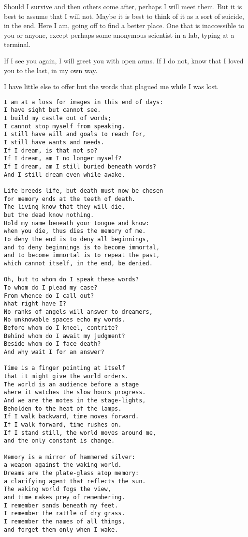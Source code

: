 Should I survive and then others come after, perhaps I will meet them. But it is best to assume that I will not. Maybe it is best to think of it as a sort of suicide, in the end. Here I am, going off to find a better place. One that is inaccessible to you or anyone, except perhaps some anonymous scientist in a lab, typing at a terminal.

If I see you again, I will greet you with open arms. If I do not, know that I loved you to the last, in my own way.

I have little else to offer but the words that plagued me while I was lost.

\begin{verbatim}
I am at a loss for images in this end of days:
I have sight but cannot see.
I build my castle out of words;
I cannot stop myself from speaking.
I still have will and goals to reach for,
I still have wants and needs.
If I dream, is that not so?
If I dream, am I no longer myself?
If I dream, am I still buried beneath words?
And I still dream even while awake.

Life breeds life, but death must now be chosen
for memory ends at the teeth of death.
The living know that they will die,
but the dead know nothing.
Hold my name beneath your tongue and know:
when you die, thus dies the memory of me.
To deny the end is to deny all beginnings,
and to deny beginnings is to become immortal,
and to become immortal is to repeat the past,
which cannot itself, in the end, be denied.

Oh, but to whom do I speak these words?
To whom do I plead my case?
From whence do I call out?
What right have I?
No ranks of angels will answer to dreamers,
No unknowable spaces echo my words.
Before whom do I kneel, contrite?
Behind whom do I await my judgment?
Beside whom do I face death?
And why wait I for an answer?

Time is a finger pointing at itself
that it might give the world orders.
The world is an audience before a stage
where it watches the slow hours progress.
And we are the motes in the stage-lights,
Beholden to the heat of the lamps.
If I walk backward, time moves forward.
If I walk forward, time rushes on.
If I stand still, the world moves around me,
and the only constant is change.

Memory is a mirror of hammered silver:
a weapon against the waking world.
Dreams are the plate-glass atop memory:
a clarifying agent that reflects the sun.
The waking world fogs the view,
and time makes prey of remembering.
I remember sands beneath my feet.
I remember the rattle of dry grass.
I remember the names of all things,
and forget them only when I wake.


\end{verbatim}
